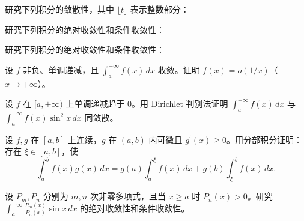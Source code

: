 \noindent\begin{minipage}{\textwidth}
研究下列积分的敛散性，其中 $\lfloor t\rfloor$ 表示整数部分：
\end{minipage}\par\vfill
\newpage
\noindent\begin{minipage}{\textwidth}
研究下列积分的绝对收敛性和条件收敛性：
\end{minipage}\par\vfill
\noindent\begin{minipage}{\textwidth}
研究下列积分的绝对收敛性和条件收敛性：
\end{minipage}\par\vfill
\noindent\begin{minipage}{\textwidth}
设 $f$ 非负、单调递减，且 $\int_a^{+\infty}f(x)\,dx$ 收敛。证明 $f(x)=o(1/x)$（$x\to+\infty$）。
\end{minipage}\par\vfill
\newpage
\noindent\begin{minipage}{\textwidth}
设 $f$ 在 $[a,+\infty)$ 上单调递减趋于 $0$。用 Dirichlet 判别法证明 $\int_a^{+\infty}f(x)\,dx$ 与 $\int_a^{+\infty}f(x)\sin^2x\,dx$ 同敛散。
\end{minipage}\par\vfill
\noindent\begin{minipage}{\textwidth}
设 $f,g$ 在 $[a,b]$ 上连续，$g$ 在 $(a,b)$ 内可微且 $g^\prime(x)\ge0$。用分部积分证明：存在 $\xi\in[a,b]$，使\[\int_a^bf(x)g(x)\,dx=g(a)\int_a^\xi f(x)\,dx+g(b)\int_\xi^bf(x)\,dx.\]
\end{minipage}\par\vfill
\noindent\begin{minipage}{\textwidth}
设 $P_m,P_n$ 分别为 $m,n$ 次非零多项式，且当 $x\ge a$ 时 $P_n(x)>0$。研究 $\displaystyle\int_a^{+\infty}\frac{P_m(x)}{P_n(x)}\sin x\,dx$ 的绝对收敛性和条件收敛性。
\end{minipage}\par\vfill
